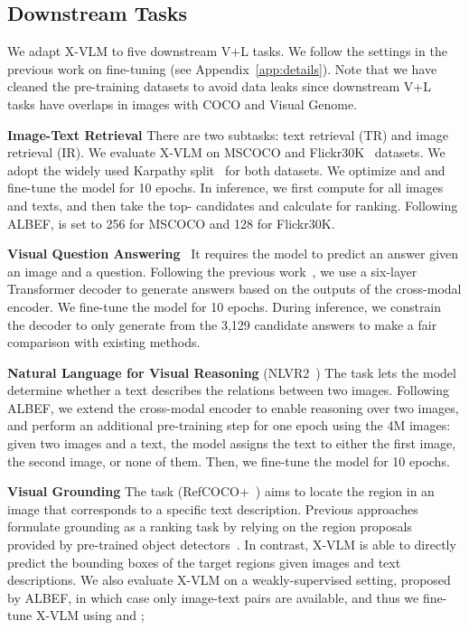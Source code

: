 \documentclass[nohyperref]{article}
\theoremstyle{plain}
\theoremstyle{definition}
\theoremstyle{remark}
\begin{document}
\subsection{Downstream Tasks}


We adapt X-VLM to five downstream V+L tasks. We follow the settings in the previous work on fine-tuning (see Appendix~\ref{app:details}). Note that we have cleaned the pre-training datasets to avoid data leaks since downstream V+L tasks have overlaps in images with COCO and Visual Genome.


\noindent \textbf{Image-Text Retrieval} There are two subtasks: text retrieval (TR) and image retrieval (IR). We evaluate X-VLM on MSCOCO and Flickr30K~\cite{plummer2015flickr30k} datasets. We adopt the widely used Karpathy split~\cite{karpathy2015deep} for both datasets. We optimize  and  and fine-tune the model for 10 epochs. In inference, we first compute  for all images and texts, and then take the top- candidates and calculate  for ranking. Following ALBEF,  is set to 256 for MSCOCO and 128 for Flickr30K. 



\noindent \textbf{Visual Question Answering}~\cite{goyal2017making} It requires the model to predict an answer given an image and a question. Following the previous work~\cite{cho2021unifying, li2021align}, we use a six-layer Transformer decoder to generate answers based on the outputs of the cross-modal encoder. We fine-tune the model for 10 epochs. During inference, we constrain the decoder to only generate from the 3,129 candidate answers to make a fair comparison with existing methods. 



\noindent \textbf{Natural Language for Visual Reasoning} (NLVR2~\cite{suhr2018corpus}) The task lets the model determine whether a text describes the relations between two images. Following ALBEF, we extend the cross-modal encoder to enable reasoning over two images, and perform an additional pre-training step for one epoch using the 4M images: given two images and a text, the model assigns the text to either the first image, the second image, or none of them. Then, we fine-tune the model for 10 epochs. 


\noindent \textbf{Visual Grounding} The task (RefCOCO+~\cite{yu2016modeling}) aims to locate the region in an image that corresponds to a specific text description. Previous approaches formulate grounding as a ranking task by relying on the region proposals provided by pre-trained object detectors~\cite{lu2019vilbert, su2019vl, chen2020uniter, gan2020large}. In contrast, X-VLM is able to directly predict the bounding boxes of the target regions given images and text descriptions. We also evaluate X-VLM on a weakly-supervised setting, proposed by ALBEF, in which case only image-text pairs are available, and thus we fine-tune X-VLM using  and ; 
\end{document}

